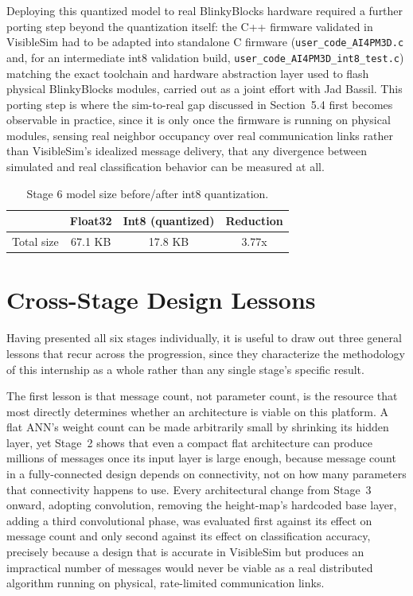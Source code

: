 \documentclass[12pt,a4paper]{report}
\begin{document}
Deploying this quantized model to real BlinkyBlocks hardware required a further porting step beyond the quantization itself: the C++ firmware validated in VisibleSim had to be adapted into standalone C firmware (\texttt{user\_code\_AI4PM3D.c} and, for an intermediate int8 validation build, \texttt{user\_code\_AI4PM3D\_int8\_test.c}) matching the exact toolchain and hardware abstraction layer used to flash physical BlinkyBlocks modules, carried out as a joint effort with Jad Bassil. This porting step is where the sim-to-real gap discussed in Section~5.4 first becomes observable in practice, since it is only once the firmware is running on physical modules, sensing real neighbor occupancy over real communication links rather than VisibleSim's idealized message delivery, that any divergence between simulated and real classification behavior can be measured at all.

\begin{table}[H]
    \centering
    \caption{Stage 6 model size before/after int8 quantization.}
    \label{tab:quantization}
    \begin{tabular}{lccc}
        \toprule
        & Float32 & Int8 (quantized) & Reduction \\
        \midrule
        Total size & 67.1 KB & 17.8 KB & 3.77x \\
        \bottomrule
    \end{tabular}
\end{table}

\section{Cross-Stage Design Lessons}

Having presented all six stages individually, it is useful to draw out three general lessons that recur across the progression, since they characterize the methodology of this internship as a whole rather than any single stage's specific result.

The first lesson is that message count, not parameter count, is the resource that most directly determines whether an architecture is viable on this platform. A flat ANN's weight count can be made arbitrarily small by shrinking its hidden layer, yet Stage~2 shows that even a compact flat architecture can produce millions of messages once its input layer is large enough, because message count in a fully-connected design depends on connectivity, not on how many parameters that connectivity happens to use. Every architectural change from Stage~3 onward, adopting convolution, removing the height-map's hardcoded base layer, adding a third convolutional phase, was evaluated first against its effect on message count and only second against its effect on classification accuracy, precisely because a design that is accurate in VisibleSim but produces an impractical number of messages would never be viable as a real distributed algorithm running on physical, rate-limited communication links.
\end{document}
